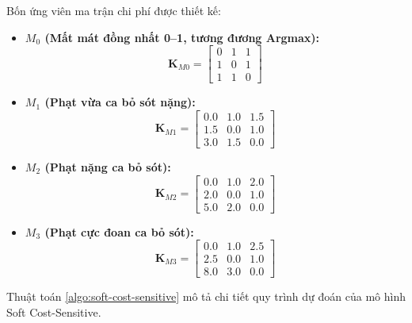 Bốn ứng viên ma trận chi phí được thiết kế:
\begin{itemize}
    \item \textbf{$M_0$ (Mất mát đồng nhất 0--1, tương đương Argmax):}
    \begin{equation}
        \mathbf{K}_{M0} = \begin{bmatrix} 0 & 1 & 1 \\ 1 & 0 & 1 \\ 1 & 1 & 0 \end{bmatrix}
    \end{equation}
    \item \textbf{$M_1$ (Phạt vừa ca bỏ sót nặng):}
    \begin{equation}
        \mathbf{K}_{M1} = \begin{bmatrix} 0.0 & 1.0 & 1.5 \\ 1.5 & 0.0 & 1.0 \\ 3.0 & 1.5 & 0.0 \end{bmatrix}
    \end{equation}
    \item \textbf{$M_2$ (Phạt nặng ca bỏ sót):}
    \begin{equation}
        \mathbf{K}_{M2} = \begin{bmatrix} 0.0 & 1.0 & 2.0 \\ 2.0 & 0.0 & 1.0 \\ 5.0 & 2.0 & 0.0 \end{bmatrix}
    \end{equation}
    \item \textbf{$M_3$ (Phạt cực đoan ca bỏ sót):}
    \begin{equation}
        \mathbf{K}_{M3} = \begin{bmatrix} 0.0 & 1.0 & 2.5 \\ 2.5 & 0.0 & 1.0 \\ 8.0 & 3.0 & 0.0 \end{bmatrix}
    \end{equation}
\end{itemize}

Thuật toán \ref{algo:soft-cost-sensitive} mô tả chi tiết quy trình dự đoán của mô hình Soft Cost-Sensitive.

